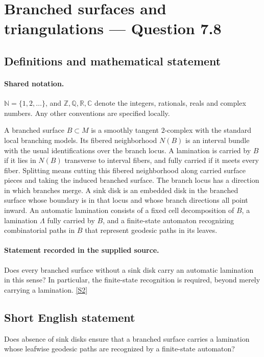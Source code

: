\documentclass[11pt]{article}
\newcommand{\sref}[2]{\hyperlink{source:#1:#2}{[S#2]}}
\begin{document}
\section{Branched surfaces and triangulations — Question 7.8}\label{statement}

\subsection{Definitions and mathematical statement}

\paragraph{Shared notation.}$\mathbb N=\{1,2,\ldots\}$, and $\mathbb Z,\mathbb Q,\mathbb R,\mathbb C$ denote the integers, rationals, reals and complex numbers. Any other conventions are specified locally.


A branched surface $B\subset M$ is a smoothly tangent $2$-complex with the standard local branching models. Its fibered neighborhood $N(B)$ is an interval bundle with the usual identifications over the branch locus. A lamination is carried by $B$ if it lies in $N(B)$ transverse to interval fibers, and fully carried if it meets every fiber. Splitting means cutting this fibered neighborhood along carried surface pieces and taking the induced branched surface. The branch locus has a direction in which branches merge. A sink disk is an embedded disk in the branched surface whose boundary is in that locus and whose branch directions all point inward. An automatic lamination consists of a fixed cell decomposition of $B$, a lamination $\Lambda$ fully carried by $B$, and a finite-state automaton recognizing combinatorial paths in $B$ that represent geodesic paths in its leaves.
\paragraph{Statement recorded in the supplied source.}
Does every branched surface without a sink disk carry an automatic lamination in this sense? In particular, the finite-state recognition is required, beyond merely carrying a lamination. \sref{statement}{2}
\subsection{Short English statement}
Does absence of sink disks ensure that a branched surface carries a lamination whose leafwise geodesic paths are recognized by a finite-state automaton?
\end{document}
